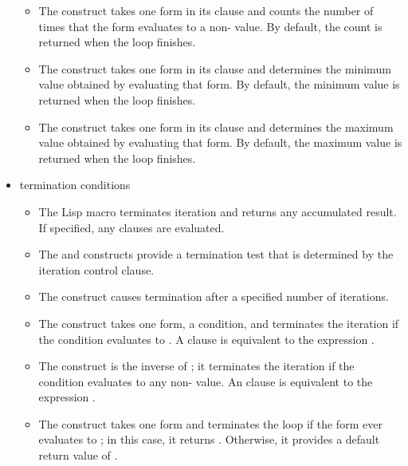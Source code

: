 \begin{new}
\begin{itemize}
\begin{itemize}
  \item 
  The  construct takes one form in its clause and counts the
  number of times that the form evaluates to a non- value.  By
  default, the count is returned when the loop finishes.

  \item
  The  construct takes one form in its clause and determines
  the minimum value obtained by evaluating that form.  By default, the
  minimum value is returned when the loop finishes.

  \item
  The  construct takes one form in its clause and 
  determines the maximum value obtained by evaluating that form.  By
  default, the maximum value is returned when the loop finishes.
  \end{itemize}

  \item
  termination conditions

  \begin{itemize}
  \item
  The  Lisp macro terminates iteration and returns any
  accumulated result.  If specified, any  clauses are evaluated.

  \item
  The  and  constructs provide a termination test
  that is determined by the iteration control clause.

  \item
   The  construct causes termination after a specified
  number of iterations.

  \item 
  The  construct takes one form, a condition, and terminates
  the iteration if
  the condition evaluates to .  A  clause is
  equivalent to the expression .  

  \item 
   The  construct is the inverse of ;
   it terminates the iteration if the condition evaluates to any non-
   value.  An  clause is equivalent to the expression
  .

  \item
  The  construct takes one form and terminates the loop 
  if the form ever evaluates to ; in this case, it returns
  .  Otherwise, it provides a default return value of .


\end{itemize}
\end{itemize}
\end{new}
